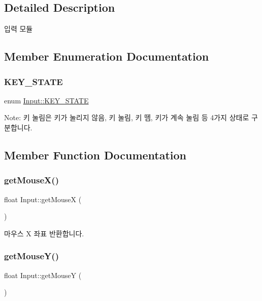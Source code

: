 \subsection{Detailed Description}
입력 모듈 

\subsection{Member Enumeration Documentation}
\mbox{\label{class_input_a3ad94f6f60870f7464dba31684faf705}} 
\subsubsection{\texorpdfstring{KEY\_STATE}{KEY\_STATE}}
{\footnotesize\ttfamily enum \mbox{\hyperlink{class_input_a3ad94f6f60870f7464dba31684faf705}{Input\+::\+K\+E\+Y\+\_\+\+S\+T\+A\+TE}}}

Note\+: 키 눌림은 키가 눌리지 않음, 키 눌림, 키 뗌, 키가 계속 눌림 등 4가지 상태로 구분합니다. 

\subsection{Member Function Documentation}
\mbox{\label{class_input_aad68569383410edc8f78a943113ce511}} 
\subsubsection{\texorpdfstring{getMouseX()}{getMouseX()}}
{\footnotesize\ttfamily float Input\+::get\+MouseX (\begin{DoxyParamCaption}{ }\end{DoxyParamCaption})}

마우스 X 좌표 반환합니다. \mbox{\label{class_input_ab8cd307e1a0fe647309da8583a51807b}} 
\subsubsection{\texorpdfstring{getMouseY()}{getMouseY()}}
{\footnotesize\ttfamily float Input\+::get\+MouseY (\begin{DoxyParamCaption}{ }\end{DoxyParamCaption})}

